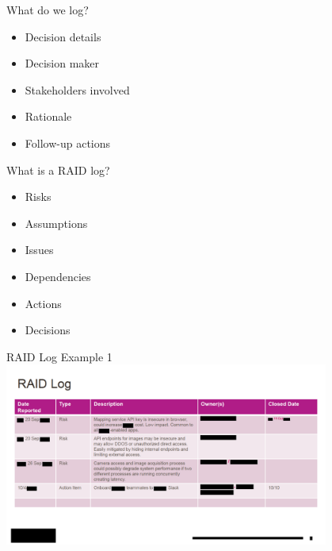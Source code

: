 \documentclass[aspectratio=169]{beamer}
\begin{document}
\begin{frame}{What do we log?}
    \begin{itemize}
        \item Decision details
        \item Decision maker
        \item Stakeholders involved
        \item Rationale
        \item Follow-up actions
    \end{itemize}
\end{frame}
\begin{frame}{What is a RAID log?}
    \begin{itemize}
        \item Risks
        \item Assumptions
        \item Issues
        \item Dependencies
        \item Actions
        \item Decisions
    \end{itemize}
\end{frame}
\begin{frame}{RAID Log Example 1}
    \centering
    \includegraphics[width=0.8\textwidth,height=0.8\textheight,keepaspectratio]{15_raid_log_example.pdf}
\end{frame}
\end{document}
